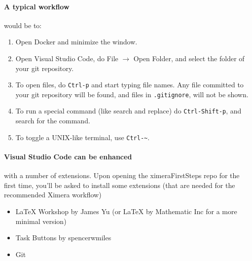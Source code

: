 \documentclass{ximera}
\begin{document}
\paragraph{A typical workflow} would be to:
\begin{enumerate}
      \item Open Docker and minimize the window.
      \item Open Visual Studio Code, do File $\to$ Open Folder, and select the
            folder of your git repository.
      \item To open files, do \verb!Ctrl-p! and start typing file names. Any
            file
            committed to your git repository will be found, and files in
            \verb!.gitignore!, will not be shown.
      \item To run a special command (like search and replace) do
            \verb!Ctrl-Shift-p!, and search for the command.
      \item To toggle a UNIX-like terminal, use \verb!Ctrl-~!.
\end{enumerate}

\paragraph{Visual Studio Code can be enhanced} with a number of extensions. 
Upon opening the ximeraFirstSteps repo for the first time, you'll be asked to install some 
extensions (that are needed for the recommended Ximera workflow)
\begin{itemize}
      \item LaTeX Workshop by James Yu (or LaTeX by Mathematic Inc for a more minimal version)  
      \item Task Buttons by spencerwmiles
      \item Git
\end{itemize}


\end{document}
